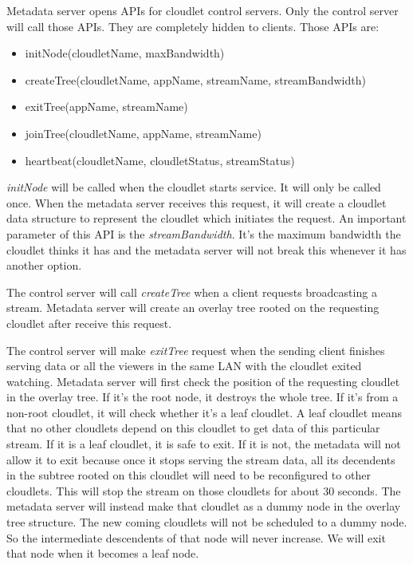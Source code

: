 \documentclass[letterpaper,twocolumn,10pt]{article}
\begin{document}
Metadata server opens APIs for cloudlet control servers. Only the control server will call those APIs. They are completely hidden to clients. Those APIs are:

\begin{itemize}
  \item initNode(cloudletName, maxBandwidth)
  \item createTree(cloudletName, appName, streamName, streamBandwidth)
  \item exitTree(appName, streamName)
  \item joinTree(cloudletName, appName, streamName)
  \item heartbeat(cloudletName, cloudletStatus, streamStatus)
\end{itemize}

\emph{initNode} will be called when the cloudlet starts service. It will only be called once. When the metadata server receives this request, it will create a cloudlet data structure to represent the cloudlet which initiates the request. An important parameter of this API is the \emph{streamBandwidth}. It's the maximum bandwidth the cloudlet thinks it has and the metadata server will not break this whenever it has another option.

The control server will call \emph{createTree} when a client requests broadcasting a stream. Metadata server will create an overlay tree rooted on the requesting cloudlet after receive this request.

The control server will make \emph{exitTree} request when the sending client finishes serving data or all the viewers in the same LAN with the cloudlet exited watching. Metadata server will first check the position of the requesting cloudlet in the overlay tree. If it's the root node, it destroys the whole tree. If it's from a non-root cloudlet, it will check whether it's a leaf cloudlet. A leaf cloudlet means that no other cloudlets depend on this cloudlet to get data of this particular stream. If it is a leaf cloudlet, it is safe to exit. If it is not, the metadata will not allow it to exit because once it stops serving the stream data, all its decendents in the subtree rooted on this cloudlet will need to be reconfigured to other cloudlets. This will stop the stream on those cloudlets for about 30 seconds. The metadata server will instead make that cloudlet as a dummy node in the overlay tree structure. The new coming cloudlets will not be scheduled to a dummy node. So the intermediate descendents of that node will never increase. We will exit that node when it becomes a leaf node. 
\end{document}
